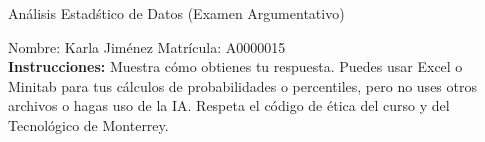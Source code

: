 \documentclass[8pt]{report}
\begin{document}
\newpage



\begin{center}
{An\'alisis Estad\'stico de Datos (Examen Argumentativo)}
\end{center}

Nombre: \underline{\hspace*{.2in}}
Karla Jiménez
\underline{\hspace*{.2in}} \quad Matr\'icula:\underline{\hspace*{.2in}}
A0000015
\underline{\hspace*{.2in}} \\

{\bf Instrucciones:} Muestra c\'omo obtienes tu respuesta. Puedes usar Excel 
o Minitab para tus cálculos de probabilidades o 
percentiles, pero no uses otros archivos o hagas uso de la IA. Respeta el 
c\'odigo de \'etica del curso y del Tecnol\'ogico 
de Monterrey.
\end{document}

